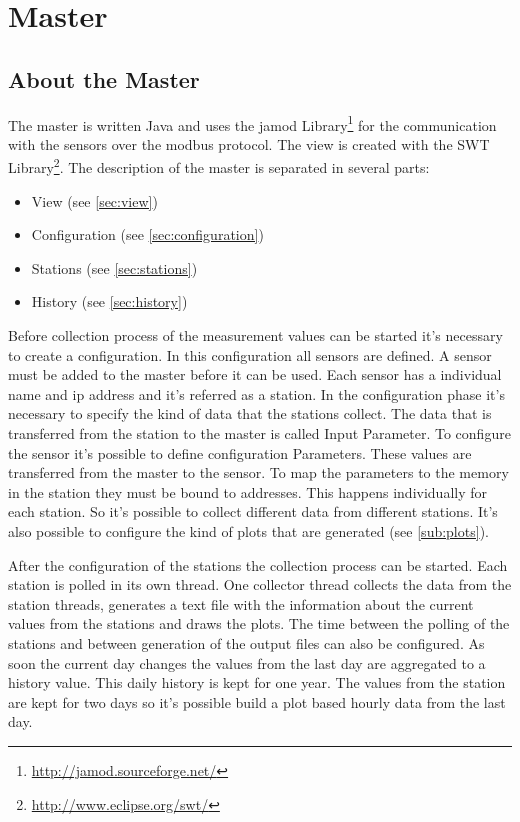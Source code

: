 
\chapter{Master}

\section{About the Master} %
\label{sec:about_the_master}

The master is written Java and uses the jamod Library\footnote{\url{http://jamod.sourceforge.net/}} for the communication with the sensors over the modbus protocol. The view is created with the SWT Library\footnote{\url{http://www.eclipse.org/swt/}}. 
The description of the master is separated in several parts:
\begin{itemize}
	\item View (see \ref{sec:view})
	\item Configuration (see \ref{sec:configuration})
	\item Stations  (see \ref{sec:stations})
	\item History (see \ref{sec:history})
\end{itemize}

Before collection process of the measurement values can be started it's necessary to create a configuration. In this configuration all sensors are defined. A sensor must be added to the master before it can be used. Each sensor has a individual name and ip address and it's referred as a station. In the configuration phase it's necessary to specify the kind of data that the stations collect. The data that is transferred from the station to the master is called Input Parameter. To configure the sensor it's possible to define configuration Parameters. These values are transferred from the master to the sensor. To map the parameters to the memory in the station they must be bound to addresses. This happens individually for each station. So it's possible to collect different data from different stations. It's also possible to configure the kind of plots that are generated (see \ref{sub:plots}).

After the configuration of the stations the collection process can be started. Each station is polled in its own thread. One collector thread collects the data from the station threads, generates a text file with the information about the current values from the stations and draws the plots. The time between the polling of the stations and between generation of the output files can also be configured. As soon the current day changes the values from the last day are aggregated to a history value. This daily history is kept for one year. The values from the station are kept for two days so it's possible build a plot based hourly data from the last day. 

